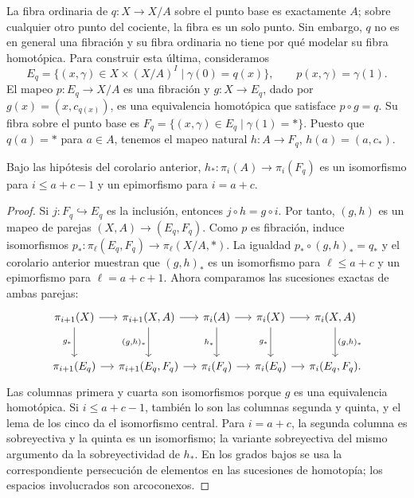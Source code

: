 La fibra ordinaria de $q\colon X\to X/A$ sobre el punto base es exactamente $A$; sobre cualquier otro punto del cociente, la fibra es un solo punto. Sin embargo, $q$ no es en general una fibración y su fibra ordinaria no tiene por qué modelar su fibra homotópica. Para construir esta última, consideramos
\[
E_q=\{(x,\gamma)\in X\times(X/A)^I\mid\gamma(0)=q(x)\},
\qquad p(x,\gamma)=\gamma(1).
\]
El mapeo $p\colon E_q\to X/A$ es una fibración y $g\colon X\to E_q$, dado por $g(x)=(x,c_{q(x)})$, es una equivalencia homotópica que satisface $p\circ g=q$. Su fibra sobre el punto base es $F_q=\{(x,\gamma)\in E_q\mid\gamma(1)=*\}$. Puesto que $q(a)=*$ para $a\in A$, tenemos el mapeo natural $h\colon A\to F_q$, $h(a)=(a,c_*)$.

\begin{teo}\label{teo:C2-fibra}
Bajo las hipótesis del corolario anterior, $h_*\colon\pi_i(A)\to\pi_i(F_q)$ es un isomorfismo para $i\leq a+c-1$ y un epimorfismo para $i=a+c$.
\end{teo}
\begin{proof}
Si $j\colon F_q\hookrightarrow E_q$ es la inclusión, entonces $j\circ h=g\circ i$. Por tanto, $(g,h)$ es un mapeo de parejas $(X,A)\to(E_q,F_q)$. Como $p$ es fibración, induce isomorfismos $p_*\colon\pi_\ell(E_q,F_q)\to\pi_\ell(X/A,*)$. La igualdad $p_*\circ(g,h)_*=q_*$ y el corolario anterior muestran que $(g,h)_*$ es un isomorfismo para $\ell\leq a+c$ y un epimorfismo para $\ell=a+c+1$. Ahora comparamos las sucesiones exactas de ambas parejas:
\[
\begin{tikzcd}[column sep=small,row sep=large]
\pi_{i+1}(X) \arrow[r] \arrow[d,"g_*"'] &
\pi_{i+1}(X,A) \arrow[r] \arrow[d,"{(g,h)_*}"'] &
\pi_i(A) \arrow[r] \arrow[d,"h_*"'] &
\pi_i(X) \arrow[r] \arrow[d,"g_*"'] &
\pi_i(X,A) \arrow[d,"{(g,h)_*}"]\\
\pi_{i+1}(E_q) \arrow[r] & \pi_{i+1}(E_q,F_q) \arrow[r] &
\pi_i(F_q) \arrow[r] & \pi_i(E_q) \arrow[r] & \pi_i(E_q,F_q).
\end{tikzcd}
\]
Las columnas primera y cuarta son isomorfismos porque $g$ es una equivalencia homotópica. Si $i\leq a+c-1$, también lo son las columnas segunda y quinta, y el lema de los cinco da el isomorfismo central. Para $i=a+c$, la segunda columna es sobreyectiva y la quinta es un isomorfismo; la variante sobreyectiva del mismo argumento da la sobreyectividad de $h_*$. En los grados bajos se usa la correspondiente persecución de elementos en las sucesiones de homotopía; los espacios involucrados son arcoconexos.
\end{proof}

